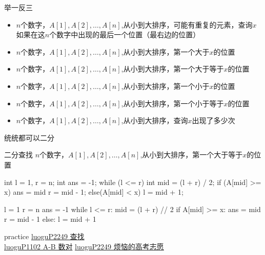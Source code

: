 \documentclass[aspectratio=169,xcolor=dvipsnames]{beamer}
\begin{document}
\begin{frame}[fragile]{举一反三}
    \begin{itemize}
        \item $n$个数字，$A[1],A[2],\ldots,A[n]$,从小到大排序，可能有重复的元素，查询$x$如果在这$n$个数字中出现的最后一个位置（最右边的位置）
        \item $n$个数字，$A[1],A[2],\ldots,A[n]$,从小到大排序，第一个大于$x$的位置
        \item $n$个数字，$A[1],A[2],\ldots,A[n]$,从小到大排序，第一个大于等于$x$的位置
        \item $n$个数字，$A[1],A[2],\ldots,A[n]$,从小到大排序，第一个小于$x$的位置
        \item $n$个数字，$A[1],A[2],\ldots,A[n]$,从小到大排序，第一个小于等于$x$的位置
        \item $n$个数字，$A[1],A[2],\ldots,A[n]$,从小到大排序，查询$x$出现了多少次
    \end{itemize}
    \vspace*{2.5em}
    统统都可以二分
\end{frame}


\begin{frame}[fragile]{二分查找}
    $n$个数字，$A[1],A[2],\ldots,A[n]$,从小到大排序，第一个大于等于$x$的位置
    \begin{minipage}{0.45\textwidth}
        \centering
        \begin{cppcode}
    int l = 1, r = n;
    int ans = -1;
    while (l <= r) {
        int mid = (l + r) / 2;
        if (A[mid] >= x) {
            ans = mid
            r = mid - 1;
        } else(A[mid] < x) {
            l = mid + 1;
        }
    }
        \end{cppcode}
    \end{minipage}%
    \hfill
    \begin{minipage}{0.45\textwidth}
        \centering
        \begin{pycode}
    l = 1
    r = n
    ans = -1
    while l <= r:
        mid = (l + r) // 2
        if A[mid] >= x:
            ans = mid
            r = mid - 1
        else:
            l = mid + 1
        \end{pycode}
    \end{minipage}
    
\end{frame}
    

\begin{frame}{practice}
    \href{https://www.luogu.com.cn/problem/P2249}{luoguP2249 查找}\\
    \href{https://www.luogu.com.cn/problem/P1102}{luoguP1102 A-B 数对}
    \href{https://www.luogu.com.cn/problem/P1678}{luoguP2249 烦恼的高考志愿}
\end{frame}
\end{document}
